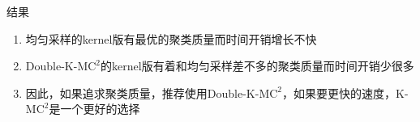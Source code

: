 \documentclass[notheorems]{beamer}
\begin{document}
\begin{CJK*}{UTF8}{gbsn}
\begin{frame}{结果}
	\begin{minipage}{0.4\linewidth}
		\scriptsize
		\begin{enumerate}
			\item 均匀采样的kernel版有最优的聚类质量而时间开销增长不快
			\item Double-K-M$\text{C}^2$的kernel版有着和均匀采样差不多的聚类质量而时间开销少很多
			\item 因此，如果追求聚类质量，推荐使用Double-K-M$\text{C}^2$，如果要更快的速度，K-M$\text{C}^2$是一个更好的选择
		\end{enumerate}
	\end{minipage}
\end{frame}
\end{CJK*}
\end{document}
